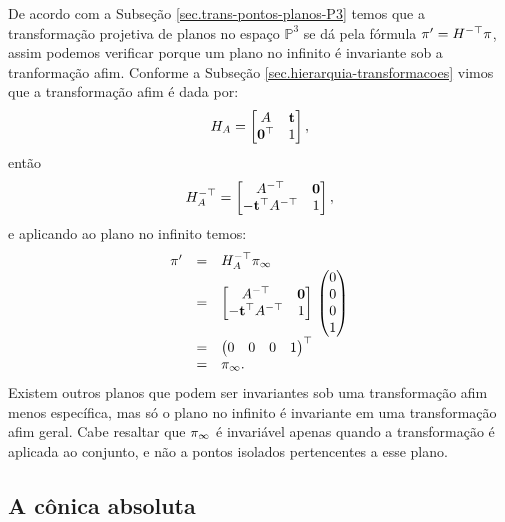 De acordo com a Subseção \ref{sec.trans-pontos-planos-P3} temos que a transformação projetiva de planos no espaço  $\mathbb{P}^3$ se dá pela fórmula $\pi'=H^{-\top}\pi$, assim podemos verificar porque um plano no infinito é invariante sob a tranformação afim. Conforme a Subseção \ref{sec.hierarquia-transformacoes} vimos que a transformação afim é dada por: 
\begin{equation*}
H_A=
\begin{bmatrix}
A&{\bf t}\\
{\bf 0}^\top&1
\end{bmatrix},
\end{equation*}
então
\begin{equation*}
H_A^{-\top}=
\begin{bmatrix}
A^{-\top}&{\bf 0}\\
-{\bf t}^\top A^{-\top}&1
\end{bmatrix},
\end{equation*}
e aplicando ao plano no infinito temos:
\begin{equation*}
\begin{array}{rcl}
\pi'&=&H_A^{-\top}\pi_\infty\\
&=&
\begin{bmatrix}
A^{-\top}&{\bf 0}\\
-{\bf t}^\top A^{-\top}&1
\end{bmatrix}\,
\begin{pmatrix}
0\\
0\\
0\\
1
\end{pmatrix}\\
&=&
\begin{pmatrix}
0&0&0&1
\end{pmatrix}^\top\\
&=&
\pi_\infty.
\end{array}
\end{equation*}
Existem outros planos que podem ser invariantes sob uma transformação afim menos específica, mas só o plano no infinito é invariante em uma transformação afim geral. Cabe resaltar que $\pi_\infty$ é invariável apenas quando a transformação é aplicada ao conjunto, e não a pontos isolados pertencentes a esse plano.
\subsection{A cônica absoluta}\label{sec.con-absoluta}

